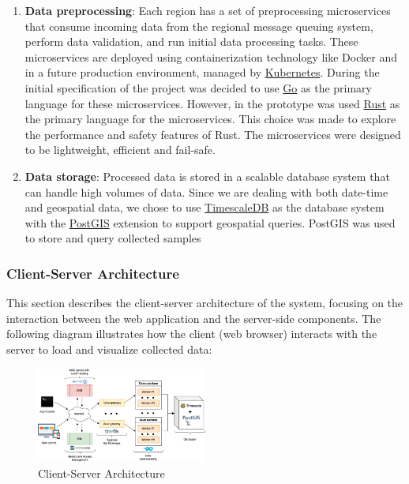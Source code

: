 \begin{enumerate}
	\item \textbf{Data preprocessing}: Each region has a set of preprocessing microservices that consume incoming data from the regional message queuing system, perform data validation, and run initial data processing tasks. These microservices are deployed using containerization technology like Docker and in a future production environment, managed by \href{https://kubernetes.io/}{Kubernetes}.
	      During the initial specification of the project was decided to use \href{https://golang.org/}{Go} as the primary language for these microservices. However, in the prototype was used \href{https://rust-lang.org/}{Rust} as the primary language for the microservices. This choice was made to explore the performance and safety features of Rust. The microservices were designed to be lightweight, efficient and fail-safe.

	\item \textbf{Data storage}: Processed data is stored in a scalable database system that can handle high volumes of data. Since we are dealing with both date-time and geospatial data, we chose to use \href{https://www.timescale.com/}{TimescaleDB} as the database system with the \href{https://postgis.net/}{PostGIS} extension to support geospatial queries.
	      PostGIS was used to store and query collected samples
\end{enumerate}

\subsubsection{Client-Server Architecture}

This section describes the client-server architecture of the system, focusing on the interaction between the web application and the server-side components. The following diagram illustrates how the client (web browser) interacts with the server to load and visualize collected data:

\begin{figure}[h!]
	\centering
	\includegraphics[width=0.5\textwidth]{../../assets/diagrams/web_app_architecture/web_app_architecture.png}
	\caption{Client-Server Architecture}
\end{figure}

